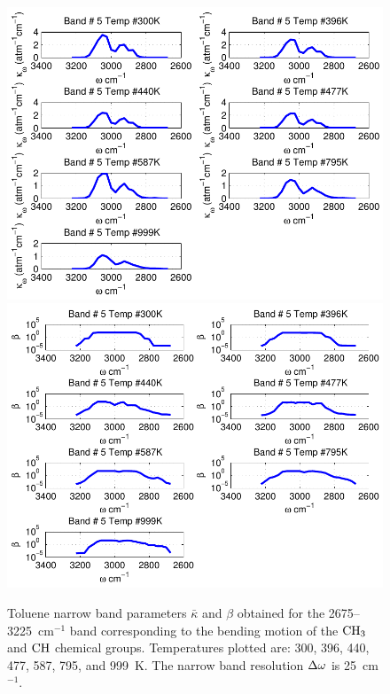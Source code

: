 \begin{figure}[p]
\begin{center}
\includegraphics[width=5.0in]{Figures/Toluene_Kappa_Band5_MALKMUS.pdf}
\includegraphics[width=5.0in]{Figures/Toluene_Beta_Band5_MALKMUS.pdf}
\end{center}
\caption{Toluene narrow band parameters $\bar{\kappa}$ and $\beta$ obtained for the 2675--3225~cm$^{-1}$ band corresponding to the bending motion of the $\rm CH_3$ and $\rm CH$ chemical groups. Temperatures plotted are: 300, 396, 440, 477, 587, 795, and 999~K. The narrow band resolution $\Delta \omega$ is 25~cm$^{-1}$.\label{fig:toluene_kappa_beta5}}
\end{figure}

\FloatBarrier

